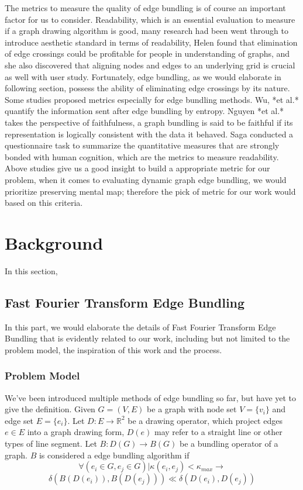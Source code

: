 \documentclass{article}
\begin{document}
\par
The metrics to measure the quality of edge bundling is of course an important factor for us to consider. Readability, which is an essential evaluation to measure if a graph drawing algorithm is good, many research had been went through to introduce aesthetic standard in terms of readability\cite{Met1,Met2,Met3}, Helen found that elimination of edge crossings could be profitable for people in understanding of graphs, and she also discovered that aligning nodes and edges to an underlying grid is crucial as well with user study. Fortunately, edge bundling, as we would elaborate in following section, possess the ability of eliminating edge crossings by its nature. Some studies proposed metrics especially for edge bundling methods. \cite{EMet1} Wu, *et al.* quantify the information sent after edge bundling by entropy. \cite{FAITH} Nguyen *et al.* takes the perspective of faithfulness, a graph bundling is said to be faithful if its representation is logically consistent with the data 
it behaved. \cite{VALID} Saga conducted a questionnaire task to summarize the quantitative measures that are strongly bonded with human cognition, which are the metrics to measure readability. Above studies give us a good insight to build a appropriate metric for our problem, when it comes to evaluating dynamic graph edge bundling, we would prioritize preserving mental map; therefore the pick of metric for our work would based on this criteria.
\section{Background}
In this section, 
\subsection{Fast Fourier Transform Edge Bundling}
In this part, we would elaborate the details of \cite{FFTEB}Fast Fourier Transform Edge Bundling that is evidently related to our work, including but not limited to the problem model, the inspiration of this work and the process.
\subsubsection{Problem Model}
We've been introduced multiple methods of edge bundling so far, but have yet to give the definition. Given $G = (V,E)$ be a graph with node set $V = \{v_i\}$ and edge set $E = \{e_i\}$. Let $D:E\to\mathbb{R}^2$ be a drawing operator, which project edges $e\in E$ into a graph drawing form, $D(e)$ may refer to a straight line or other types of line segment. Let $B:D(G)\to B(G)$ be a bundling operator of a graph. $B$ is considered a edge bundling algorithm if
\begin{displaymath}
\forall (e_i\in G, e_j\in G)|\kappa(e_i,e_j)<\kappa_{max}\to
\end{displaymath}
\begin{equation}
\delta(B(D(e_i)),B(D(e_j)))\ll \delta(D(e_i),D(e_j))
\end{equation}
\end{document}
